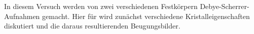 In diesem Versuch werden von zwei verschiedenen Festkörpern Debye-Scherrer-Aufnahmen gemacht. Hier für wird zunächst verschiedene Kristalleigenschaften diskutiert und die daraus resultierenden Beugungsbilder.